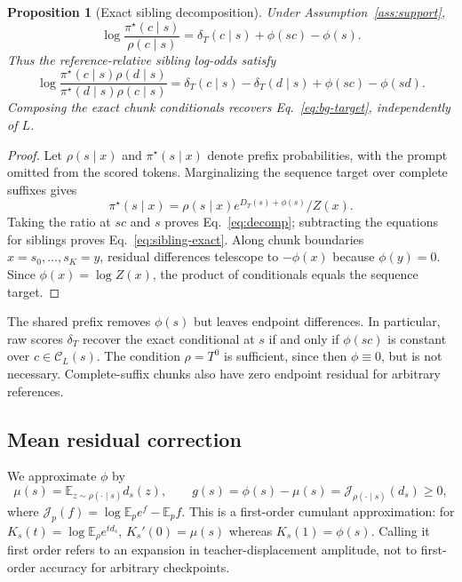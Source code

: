 \documentclass[pdflatex,sn-mathphys-num,review]{sn-jnl}
\theoremstyle{thmstyleone}
\newtheorem{proposition}[theorem]{Proposition}
\theoremstyle{thmstyletwo}
\theoremstyle{thmstylethree}
\providecommand{\Tz}{T^{0}}
\providecommand{\popt}{\pi^{\star}}
\providecommand{\E}{\mathbb{E}}
\providecommand{\Jg}{\mathcal{J}}
\providecommand{\Cset}{\mathcal{C}}
\begin{document}
\begin{proposition}[Exact sibling decomposition]
\label{prop:decomp}
Under Assumption~\ref{ass:support},
\begin{equation}
\log\frac{\popt(c\mid s)}{\rho(c\mid s)}=\delta_T(c\mid s)+\phi(sc)-\phi(s).
\label{eq:decomp}
\end{equation}
Thus the reference-relative sibling log-odds satisfy
\begin{equation}
\log\frac{\popt(c\mid s)\rho(d\mid s)}{\popt(d\mid s)\rho(c\mid s)}
=\delta_T(c\mid s)-\delta_T(d\mid s)+\phi(sc)-\phi(sd).
\label{eq:sibling-exact}
\end{equation}
Composing the exact chunk conditionals recovers Eq.~\eqref{eq:bg-target}, independently of $L$.
\end{proposition}
\begin{proof}
Let $\rho(s\mid x)$ and $\popt(s\mid x)$ denote prefix probabilities, with the prompt omitted from the scored tokens. Marginalizing the sequence target over complete suffixes gives
\[
\popt(s\mid x)=\rho(s\mid x)e^{D_T(s)+\phi(s)}/Z(x).
\]
Taking the ratio at $sc$ and $s$ proves Eq.~\eqref{eq:decomp}; subtracting the equations for siblings proves Eq.~\eqref{eq:sibling-exact}. Along chunk boundaries $x=s_0,\ldots,s_K=y$, residual differences telescope to $-\phi(x)$ because $\phi(y)=0$. Since $\phi(x)=\log Z(x)$, the product of conditionals equals the sequence target.
\end{proof}

The shared prefix removes $\phi(s)$ but leaves endpoint differences. In particular, raw scores $\delta_T$ recover the exact conditional at $s$ if and only if $\phi(sc)$ is constant over $c\in\Cset_L(s)$. The condition $\rho=\Tz$ is sufficient, since then $\phi\equiv0$, but is not necessary. Complete-suffix chunks also have zero endpoint residual for arbitrary references.

\subsection{Mean residual correction}
\label{subsec:correction}
We approximate $\phi$ by
\begin{equation}
\mu(s)=\E_{z\sim\rho(\cdot\mid s)}d_s(z),\qquad
g(s)=\phi(s)-\mu(s)=\Jg_{\rho(\cdot\mid s)}(d_s)\ge0,
\label{eq:mu}
\end{equation}
where $\Jg_p(f)=\log\E_pe^f-\E_pf$. This is a first-order cumulant approximation: for $K_s(t)=\log\E_\rho e^{t d_s}$, $K_s'(0)=\mu(s)$ whereas $K_s(1)=\phi(s)$. Calling it first order refers to an expansion in teacher-displacement amplitude, not to first-order accuracy for arbitrary checkpoints.
\end{document}
